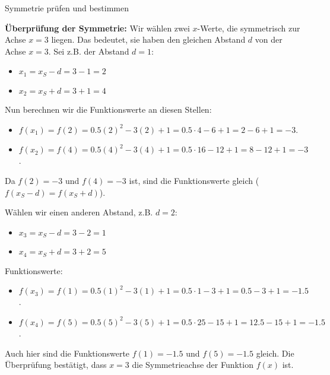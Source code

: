 \begin{loesungsumgebung}{Symmetrie prüfen und bestimmen}
\begin{enumerate}[label=(\alph*)]
    \textbf{Überprüfung der Symmetrie:}
    Wir wählen zwei $x$-Werte, die symmetrisch zur Achse $x=3$ liegen. Das bedeutet, sie haben den gleichen Abstand $d$ von der Achse $x=3$.
    Sei z.B. der Abstand $d=1$:
    \begin{itemize}
        \item $x_1 = x_S - d = 3 - 1 = 2$
        \item $x_2 = x_S + d = 3 + 1 = 4$
    \end{itemize}
    Nun berechnen wir die Funktionswerte an diesen Stellen:
    \begin{itemize}
        \item $f(x_1) = f(2) = 0.5(2)^2 - 3(2) + 1 = 0.5 \cdot 4 - 6 + 1 = 2 - 6 + 1 = -3$.
        \item $f(x_2) = f(4) = 0.5(4)^2 - 3(4) + 1 = 0.5 \cdot 16 - 12 + 1 = 8 - 12 + 1 = -3$.
    \end{itemize}
    Da $f(2) = -3$ und $f(4) = -3$ ist, sind die Funktionswerte gleich ($f(x_S-d) = f(x_S+d)$).

    Wählen wir einen anderen Abstand, z.B. $d=2$:
    \begin{itemize}
        \item $x_3 = x_S - d = 3 - 2 = 1$
        \item $x_4 = x_S + d = 3 + 2 = 5$
    \end{itemize}
    Funktionswerte:
    \begin{itemize}
        \item $f(x_3) = f(1) = 0.5(1)^2 - 3(1) + 1 = 0.5 \cdot 1 - 3 + 1 = 0.5 - 3 + 1 = -1.5$.
        \item $f(x_4) = f(5) = 0.5(5)^2 - 3(5) + 1 = 0.5 \cdot 25 - 15 + 1 = 12.5 - 15 + 1 = -1.5$.
    \end{itemize}
    Auch hier sind die Funktionswerte $f(1) = -1.5$ und $f(5) = -1.5$ gleich.
    Die Überprüfung bestätigt, dass $x=3$ die Symmetrieachse der Funktion $f(x)$ ist.
\end{enumerate}

\end{loesungsumgebung}



